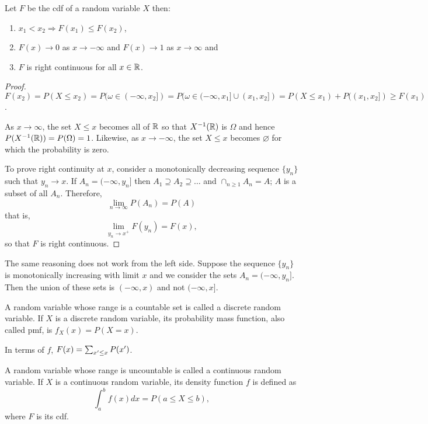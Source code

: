 \documentclass{article}
\begin{document}
\begin{thm}\label{c2t2}
Let $F$ be the cdf of a random variable $X$ then:
\begin{enumerate}
\item $x_1 < x_2 \Rightarrow F(x_1) \le F(x_2)$,
\item $F(x) \rightarrow 0$ as $x \rightarrow -\infty$ and $F(x) \rightarrow 1$
as $x \rightarrow \infty$ and
\item $F$ is right continuous for all $x \in \mathbb{R}$.
\end{enumerate}
\end{thm}
\begin{proof}
$F(x_2) = P(X \le x_2) = P(\omega \in (-\infty, x_2]) = P(\omega \in (-\infty, x_1]
\cup (x_1, x_2]) = P(X \le x_1) + P((x_1, x_2]) \ge F(x_1)$.

As $x \rightarrow \infty$, the set $X \le x$ becomes all of $\mathbb{R}$ so that 
$X^{-1}(\mathbb{R})$ is $\Omega$ and hence $P(X^{-1}(\mathbb{R})) = P(\Omega) = 1$. Likewise,
as $x \rightarrow -\infty$, the set $X \le x$ becomes $\varnothing$ for which
the probability is zero.

To prove right continuity at $x$, consider a monotonically decreasing sequence 
$\{y_n\}$ such that $y_n \rightarrow x$. If $A_n = (-\infty, y_n]$ then $A_1
\supseteq A_2 \supseteq \ldots$ and $\cap_{n \ge 1}A_n = A$; $A$ is a subset of
all $A_n$. Therefore,
\[
\lim_{n \rightarrow \infty}P(A_n) = P(A)
\]
that is, 
\[
\lim_{y_n \rightarrow x^+}F(y_n) = F(x),
\]
so that $F$ is right continuous.
\end{proof}
\begin{rem}
The same reasoning does not work from the left side. Suppose the sequence $\{y_n\}$
is monotonically increasing with limit $x$ and we consider the sets $A_n = (-\infty,
y_n]$. Then the union of these sets is $(-\infty, x)$ and not $(-\infty, x]$.
\end{rem}

\begin{defn}\label{c2d7}
A random variable whose range is a countable set is called a discrete random 
variable. If $X$ is a discrete random variable, its probability mass function,
also called pmf, is $f_X(x) = P(X = x)$.
\end{defn}

In terms of $f$, $F(x) = \sum_{x^\prime \le x}P(x^\prime)$.

\begin{defn}\label{c2d8}
A random variable whose range is uncountable is called a continuous random
variable. If $X$ is a continuous random variable, its density function $f$ is
defined as
\[
\int_a^b f(x)dx = P(a \le X \le b),
\]
where $F$ is its cdf.
\end{defn}
\end{document}
